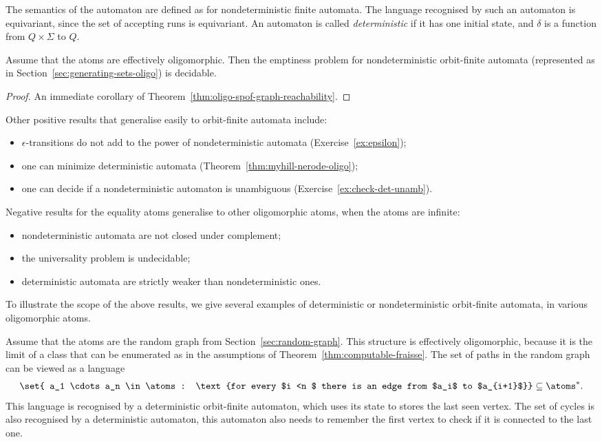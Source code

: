 The semantics of the automaton are defined as for nondeterministic finite automata. The language recognised by such an automaton is equivariant, since the set of accepting runs is equivariant.
An automaton is called \emph{deterministic} if it has one initial state, and $\delta$ is a function from $Q \times \Sigma$ to $Q$. 


\begin{theorem}\label{thm:olig-nfa-nonemptiness}
	Assume that the atoms are effectively oligomorphic.
	Then the emptiness problem for nondeterministic orbit-finite automata (represented as in Section~\ref{sec:generating-sets-oligo}) is decidable.  
	\end{theorem}
\begin{proof}
	An immediate corollary of Theorem~\ref{thm:oligo-spof-graph-reachability}. 
\end{proof}

Other positive results that generalise easily to orbit-finite automata include:
\begin{itemize}
	\item  $\epsilon$-transitions do not add to the power of nondeterministic automata (Exercise~\ref{ex:epsilon});
	\item one can minimize deterministic automata (Theorem~\ref{thm:myhill-nerode-oligo});
	\item one can decide if a nondeterministic automaton is unambiguous (Exercise~\ref{ex:check-det-unamb}).
\end{itemize}
Negative results for the equality atoms generalise to other oligomorphic atoms, when the atoms are infinite: 
\begin{itemize}
	\item nondeterministic  automata are not closed under complement;
	\item the universality problem is undecidable;
	\item deterministic automata are strictly weaker than nondeterministic ones.
\end{itemize}



To illustrate the scope of the above results,  we  give several examples of deterministic or nondeterministic orbit-finite automata, in various oligomorphic atoms. 
\begin{myexample}\label{ex:graph-atoms-automaton} Assume that the atoms are the random graph from Section~\ref{sec:random-graph}. This structure is effectively oligomorphic, because it is the \fraisse limit of a \fraisse class that can be enumerated as in the assumptions of Theorem~\ref{thm:computable-fraisse}. The set of paths in the random graph can be viewed as a language 
	\begin{align*}
	\set{ a_1 \cdots a_n \in \atoms : \text{for every $i <n $ there is an edge from $a_i$ to $a_{i+1}$}} \subseteq \atoms^*.
	\end{align*}
	This language is recognised by a deterministic orbit-finite automaton, which uses its state to stores the last seen vertex. The set of cycles is also recognised by a deterministic automaton, this automaton also needs to remember the first vertex to check if it is connected to the last one. 
   \end{myexample}


